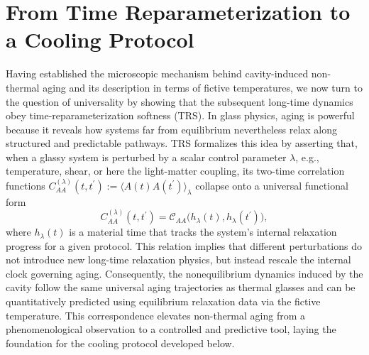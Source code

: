 \documentclass[aps, prl,
 reprint,
 superscriptaddress,
 citeautoscript,  %
 amsmath,amssymb,
 tightenlines
]{revtex4-2}
\begin{document}
\section*{From Time Reparameterization to a Cooling Protocol}



Having established the microscopic mechanism behind cavity-induced non-thermal aging and its description in terms of fictive temperatures, we now turn to the question of universality by showing that the subsequent long-time dynamics obey time-reparameterization softness (TRS).\cite{Cugliandolo1993,Cugliandolo1997,chamon2002separation,Chamon2002,Chamon2007,Kurchan2023,ghimenti2024cleveralgorithmsglassesdo} In glass physics, aging is powerful because it reveals how systems far from equilibrium nevertheless relax along structured and predictable pathways. TRS formalizes this idea by asserting that, when a glassy system is perturbed by a scalar control parameter $\lambda$, e.g., temperature, shear, or here the light-matter coupling, its two-time correlation functions $C_{AA}^{(\lambda)}(t,t^\prime):= \langle A(t) A(t^\prime) \rangle_\lambda$ collapse onto a universal functional form
\begin{equation}
C_{AA}^{(\lambda)}(t,t^\prime)=\mathcal{C}_{AA}\big(h_\lambda(t),h_\lambda(t^\prime)\big), \label{eq:TRS}
\end{equation}
where $h_\lambda(t)$ is a material time that tracks the system’s internal relaxation progress for a given protocol. This relation implies that different perturbations do not introduce new long-time relaxation physics, but instead rescale the internal clock governing aging. Consequently, the nonequilibrium dynamics induced by the cavity follow the same universal aging trajectories as thermal glasses and can be quantitatively predicted using equilibrium relaxation data via the fictive temperature. This correspondence elevates non-thermal aging from a phenomenological observation to a controlled and predictive tool, laying the foundation for the cooling protocol developed below.
\end{document}
